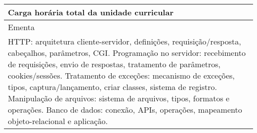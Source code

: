 \begin{quadro}[h!]
\begin{tabular}{|p{3cm} p{2cm} p{3cm} p{2cm} p{3cm} p{2cm}|}
\multicolumn{5}{|p{13cm}|}{\cellcolor{blue1} Carga horária total da unidade curricular} & \multicolumn{1}{p{1cm}|}{\raggedleft 60	}\\\hline
\multicolumn{6}{|p{15cm}|}{\cellcolor{blue1} Ementa} \\\hline
\hline\multicolumn{6}{|p{15cm}|}{\scriptsize HTTP: arquitetura cliente-servidor, definições, requisição/resposta, cabeçalhos, parâmetros, CGI. Programação no servidor: recebimento de requisições, envio de respostas, tratamento de parâmetros, cookies/sessões. Tratamento de exceções: mecanismo de exceções, tipos, captura/lançamento, criar classes, sistema de registro. Manipulação de arquivos: sistema de arquivos, tipos, formatos e operações. Banco de dados: conexão, APIs, operações, mapeamento objeto-relacional e aplicação.}\\\hline
\hline
	\end{tabular}
\end{quadro}
